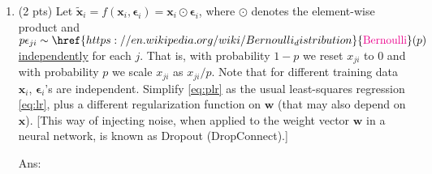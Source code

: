 \documentclass[10pt]{article}
\newcommand{\wv}{\mathbf{w}}
\newcommand{\xv}{\mathbf{x}}
\newcommand{\epsilonv}{\boldsymbol{\epsilon}}
\newcommand{\ans}[1]{{\color{blue}\textsf{Ans}: #1}}
\newcommand{\magenta}[1]{{\color{magenta}#1}}
\begin{document}
\begin{exercise}
\begin{enumerate}
			\item (2 pts) Let $\tilde{\xv}_i = f(\xv_i, \epsilonv_i) = \xv_i \odot \epsilonv_i$, where $\odot$ denotes the element-wise product and $p \epsilon_{ji} \sim \href{https://en.wikipedia.org/wiki/Bernoulli_distribution}{\magenta{\mathrm{Bernoulli}}}(p)$ \href{https://en.wikipedia.org/wiki/Independence_(probability_theory)}{\magenta{independently}} for each $j$. That is, with probability $1-p$ we reset $x_{ji} $ to 0 and with probability $p$ we scale $x_{ji}$ as $x_{ji}/p$. Note that for different training data $\xv_i$, $\epsilonv_i$'s are independent. Simplify \eqref{eq:plr} as the usual least-squares regression \eqref{eq:lr}, plus a different regularization function on $\wv$ (that may also depend on $\xv$). [This way of injecting noise, when applied to the weight vector $\wv$ in a neural network, is known as Dropout (DropConnect).]
	
		    \ans{\vskip8cm} 		
		\end{enumerate}
	\end{exercise}
\end{document}
